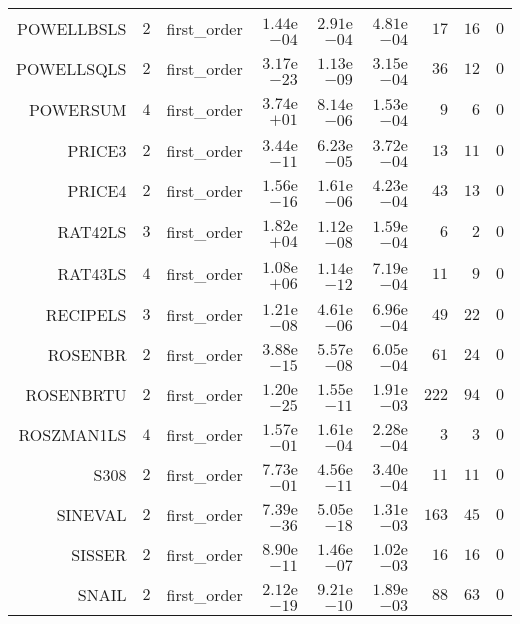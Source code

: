 \begin{longtable}{rrrrrrrrr}
POWELLBSLS & \(     2\) & first\_order & \( 1.44\)e\(-04\) & \( 2.91\)e\(-04\) & \( 4.81\)e\(-04\) & \(    17\) & \(    16\) & \(     0\) \\
POWELLSQLS & \(     2\) & first\_order & \( 3.17\)e\(-23\) & \( 1.13\)e\(-09\) & \( 3.15\)e\(-04\) & \(    36\) & \(    12\) & \(     0\) \\
POWERSUM & \(     4\) & first\_order & \( 3.74\)e\(+01\) & \( 8.14\)e\(-06\) & \( 1.53\)e\(-04\) & \(     9\) & \(     6\) & \(     0\) \\
PRICE3 & \(     2\) & first\_order & \( 3.44\)e\(-11\) & \( 6.23\)e\(-05\) & \( 3.72\)e\(-04\) & \(    13\) & \(    11\) & \(     0\) \\
PRICE4 & \(     2\) & first\_order & \( 1.56\)e\(-16\) & \( 1.61\)e\(-06\) & \( 4.23\)e\(-04\) & \(    43\) & \(    13\) & \(     0\) \\
RAT42LS & \(     3\) & first\_order & \( 1.82\)e\(+04\) & \( 1.12\)e\(-08\) & \( 1.59\)e\(-04\) & \(     6\) & \(     2\) & \(     0\) \\
RAT43LS & \(     4\) & first\_order & \( 1.08\)e\(+06\) & \( 1.14\)e\(-12\) & \( 7.19\)e\(-04\) & \(    11\) & \(     9\) & \(     0\) \\
RECIPELS & \(     3\) & first\_order & \( 1.21\)e\(-08\) & \( 4.61\)e\(-06\) & \( 6.96\)e\(-04\) & \(    49\) & \(    22\) & \(     0\) \\
ROSENBR & \(     2\) & first\_order & \( 3.88\)e\(-15\) & \( 5.57\)e\(-08\) & \( 6.05\)e\(-04\) & \(    61\) & \(    24\) & \(     0\) \\
ROSENBRTU & \(     2\) & first\_order & \( 1.20\)e\(-25\) & \( 1.55\)e\(-11\) & \( 1.91\)e\(-03\) & \(   222\) & \(    94\) & \(     0\) \\
ROSZMAN1LS & \(     4\) & first\_order & \( 1.57\)e\(-01\) & \( 1.61\)e\(-04\) & \( 2.28\)e\(-04\) & \(     3\) & \(     3\) & \(     0\) \\
S308 & \(     2\) & first\_order & \( 7.73\)e\(-01\) & \( 4.56\)e\(-11\) & \( 3.40\)e\(-04\) & \(    11\) & \(    11\) & \(     0\) \\
SINEVAL & \(     2\) & first\_order & \( 7.39\)e\(-36\) & \( 5.05\)e\(-18\) & \( 1.31\)e\(-03\) & \(   163\) & \(    45\) & \(     0\) \\
SISSER & \(     2\) & first\_order & \( 8.90\)e\(-11\) & \( 1.46\)e\(-07\) & \( 1.02\)e\(-03\) & \(    16\) & \(    16\) & \(     0\) \\
SNAIL & \(     2\) & first\_order & \( 2.12\)e\(-19\) & \( 9.21\)e\(-10\) & \( 1.89\)e\(-03\) & \(    88\) & \(    63\) & \(     0\) \\

\end{longtable}
